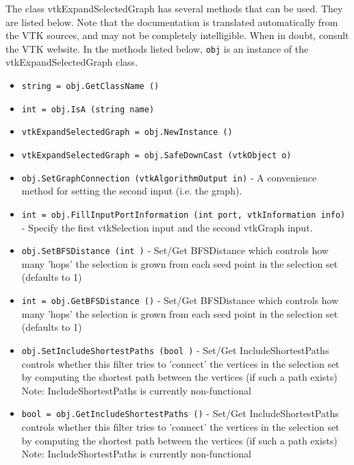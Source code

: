The class vtkExpandSelectedGraph has several methods that can be used.
  They are listed below.
Note that the documentation is translated automatically from the VTK sources,
and may not be completely intelligible.  When in doubt, consult the VTK website.
In the methods listed below, \verb|obj| is an instance of the vtkExpandSelectedGraph class.
\begin{itemize}
\item  \verb|string = obj.GetClassName ()|

\item  \verb|int = obj.IsA (string name)|

\item  \verb|vtkExpandSelectedGraph = obj.NewInstance ()|

\item  \verb|vtkExpandSelectedGraph = obj.SafeDownCast (vtkObject o)|

\item  \verb|obj.SetGraphConnection (vtkAlgorithmOutput in)| -  A convenience method for setting the second input (i.e. the graph).

\item  \verb|int = obj.FillInputPortInformation (int port, vtkInformation info)| -  Specify the first vtkSelection input and the second vtkGraph input.

\item  \verb|obj.SetBFSDistance (int )| -  Set/Get BFSDistance which controls how many 'hops' the selection 
 is grown from each seed point in the selection set (defaults to 1)

\item  \verb|int = obj.GetBFSDistance ()| -  Set/Get BFSDistance which controls how many 'hops' the selection 
 is grown from each seed point in the selection set (defaults to 1)

\item  \verb|obj.SetIncludeShortestPaths (bool )| -  Set/Get IncludeShortestPaths controls whether this filter tries to 
 'connect' the vertices in the selection set by computing the
 shortest path between the vertices (if such a path exists)
 Note: IncludeShortestPaths is currently non-functional

\item  \verb|bool = obj.GetIncludeShortestPaths ()| -  Set/Get IncludeShortestPaths controls whether this filter tries to 
 'connect' the vertices in the selection set by computing the
 shortest path between the vertices (if such a path exists)
 Note: IncludeShortestPaths is currently non-functional


\end{itemize}
